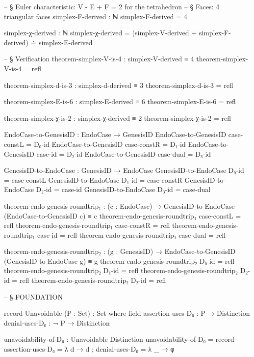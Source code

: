 \documentclass[11pt,a4paper]{book}
\begin{document}
\begin{code}
-- § Euler characteristic: V - E + F = 2 for the tetrahedron
-- § Faces: 4 triangular faces
simplex-F-derived : ℕ
simplex-F-derived = 4

simplex-χ-derived : ℕ
simplex-χ-derived = (simplex-V-derived + simplex-F-derived) ∸ simplex-E-derived

-- § Verification
theorem-simplex-V-is-4 : simplex-V-derived ≡ 4
theorem-simplex-V-is-4 = refl

theorem-simplex-d-is-3 : simplex-d-derived ≡ 3
theorem-simplex-d-is-3 = refl

theorem-simplex-E-is-6 : simplex-E-derived ≡ 6
theorem-simplex-E-is-6 = refl

theorem-simplex-χ-is-2 : simplex-χ-derived ≡ 2
theorem-simplex-χ-is-2 = refl

EndoCase-to-GenesisID : EndoCase → GenesisID
EndoCase-to-GenesisID case-constL = D₀-id
EndoCase-to-GenesisID case-constR = D₁-id
EndoCase-to-GenesisID case-id     = D₂-id
EndoCase-to-GenesisID case-dual   = D₃-id

GenesisID-to-EndoCase : GenesisID → EndoCase
GenesisID-to-EndoCase D₀-id = case-constL
GenesisID-to-EndoCase D₁-id = case-constR
GenesisID-to-EndoCase D₂-id = case-id
GenesisID-to-EndoCase D₃-id = case-dual

theorem-endo-genesis-roundtrip₁ : (c : EndoCase) →
  GenesisID-to-EndoCase (EndoCase-to-GenesisID c) ≡ c
theorem-endo-genesis-roundtrip₁ case-constL = refl
theorem-endo-genesis-roundtrip₁ case-constR = refl
theorem-endo-genesis-roundtrip₁ case-id     = refl
theorem-endo-genesis-roundtrip₁ case-dual   = refl

theorem-endo-genesis-roundtrip₂ : (g : GenesisID) →
  EndoCase-to-GenesisID (GenesisID-to-EndoCase g) ≡ g
theorem-endo-genesis-roundtrip₂ D₀-id = refl
theorem-endo-genesis-roundtrip₂ D₁-id = refl
theorem-endo-genesis-roundtrip₂ D₂-id = refl
theorem-endo-genesis-roundtrip₂ D₃-id = refl


-- § FOUNDATION

record Unavoidable (P : Set) : Set where
  field
    assertion-uses-D₀ : P → Distinction
    denial-uses-D₀    : ¬ P → Distinction

unavoidability-of-D₀ : Unavoidable Distinction
unavoidability-of-D₀ = record
  { assertion-uses-D₀ = λ d → d
  ; denial-uses-D₀    = λ _ → φ
  }


\end{code}
\end{document}
